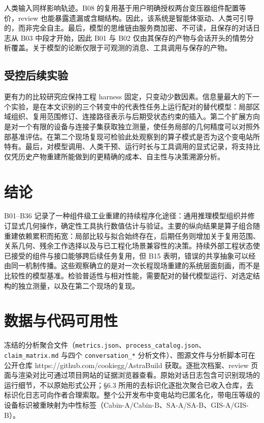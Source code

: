 \documentclass[10pt,a4paper]{article}
\begin{document}
人类输入同样影响轨迹。B08
的复用基于用户明确授权两台变压器组件配置等价，review
也能暴露遗漏或含糊结构。因此，该系统是智能体驱动、人类可引导的，而非完全自主。最后，模型的思维链由服务商加密、不可读，且保存的对话日志从
B03 中段才开始，因此 B01 与 B02
仅由其保存的产物与会话开头的情势分析覆盖。关于模型的论断仅限于可观测的消息、工具调用与保存的产物。

\hypertarget{ux53d7ux63a7ux540eux7eedux5b9eux9a8c}{%
\subsection{受控后续实验}\label{ux53d7ux63a7ux540eux7eedux5b9eux9a8c}}

更有力的比较研究应保持工程 harness
固定，只变动少数因素。信息量最大的下一个实验，是在本文识别的三个转变中的代表性任务上运行配对的替代模型：局部区域组织、复用范围修订、连接路径表示与后期受状态约束的插入。第二个扩展方向是对一个有限的设备与连接子集获取独立测量，使任务局部的几何精度可以对照外部基准评估。在第二个现场复现可检验此处观察到的算子模式是否为这个变电站所特有。最后，对模型调用、人类干预、运行时长与工具调用的显式记录，将支持比仅凭历史产物重建所能做到的更精确的成本、自主性与决策溯源分析。

\hypertarget{ux7ed3ux8bba}{%
\section{结论}\label{ux7ed3ux8bba}}

B01--B36
记录了一种组件级工业重建的持续程序化途径：通用推理模型组织并修订显式几何操作，确定性工具执行数值估计与验证。主要的纵向结果是算子组合随重建依赖累积而拓宽：局部比较与拟合始终存在，后期任务则增加关于复用范围、关系几何、残余工作选择以及与已工程化场景兼容性的决策。持续外部工程状态使已接受的组件与接口能够跨后续任务复用，但
B15
表明，错误的共享抽象可以经由同一机制传播。这些观察确立的是对一次长程现场重建的系统层面刻画，而不是比较性的模型基准。检验普适性与相对性能，需要配对的替代模型运行、对选定结构的独立测量，以及在第二个现场的复现。

\hypertarget{ux6570ux636eux4e0eux4ee3ux7801ux53efux7528ux6027}{%
\section{数据与代码可用性}\label{ux6570ux636eux4e0eux4ee3ux7801ux53efux7528ux6027}}

冻结的分析聚合文件（\texttt{metrics.json}、\texttt{process\_catalog.json}、\texttt{claim\_matrix.md}
与四个 \texttt{conversation\_*}
分析文件）、图源文件与分析脚本可在公开仓库
https://github.com/cookiegg/AstraBuild 获取。逐批次档案、review
页面与渲染对比可通过项目网站的证据浏览器查看。原始对话日志包含可识别现场的运行细节，不以原始形式公开；§6.3
所用的去标识化逐批次聚合已收入仓库，去标识化日志可向作者合理索取。整个公开发布中变电站均已匿名化，带电压等级的设备标识被重映射为中性标签（Cabin-A/Cabin-B、SA-A/SA-B、GIS-A/GIS-B）。
\small


\end{document}
